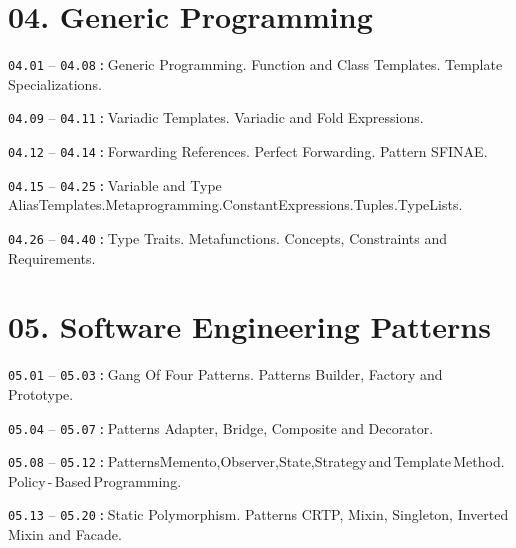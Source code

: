 \documentclass[a4paper,12pt]{article}
\renewenvironment{itemize}
{
    \begin{list}{\labelitemi}
    {
      \setlength{\topsep}{0pt}
      \setlength{\partopsep}{0pt}
      \setlength{\parskip}{0pt}
      \setlength{\itemsep}{0pt}
      \setlength{\parsep}{0pt}
      \setlength{\leftmargin}{14.5pt}
    }
}{\end{list}}
\begin{document}
\section{04. Generic Programming}

\begin{itemize}

    \item \texttt{04.01} -- \texttt{04.08}\,\texttt{:}\,Generic Programming. Function and Class Templates. Template Specializations. 

    \smallskip

    \item \texttt{04.09} -- \texttt{04.11}\,\texttt{:}\,Variadic Templates. Variadic and Fold Expressions.

    \smallskip

    \item \texttt{04.12} -- \texttt{04.14}\,\texttt{:}\,Forwarding References. Perfect Forwarding. Pattern SFINAE.

    \smallskip

    \item \texttt{04.15} -- \texttt{04.25}\,\texttt{:}\,Variable and Type Alias\:Templates.\:Metaprogramming.\:Constant\:Expressions.\:Tuples.\:Type\:Lists.

    \smallskip

    \item \texttt{04.26} -- \texttt{04.40}\,\texttt{:}\,Type Traits. Metafunctions. Concepts, Constraints and Requirements.

    \smallskip
    
\end{itemize}

\section{05. Software Engineering Patterns}

\begin{itemize}

    \item \texttt{05.01} -- \texttt{05.03}\,\texttt{:}\,Gang Of Four Patterns. Patterns Builder, Factory and Prototype.

    \smallskip

    \item \texttt{05.04} -- \texttt{05.07}\,\texttt{:}\,Patterns Adapter, Bridge, Composite and Decorator.

    \smallskip

    \item \texttt{05.08} -- \texttt{05.12}\,\texttt{:}\,Patterns\:Memento,\:Observer,\:State,\:Strategy\,and\,Template\,Method.\,Policy\,-\,Based\,Programming.

    \smallskip

    \item \texttt{05.13} -- \texttt{05.20}\,\texttt{:}\,Static Polymorphism. Patterns CRTP, Mixin, Singleton, Inverted Mixin and Facade.
    
\end{itemize}
\end{document}
